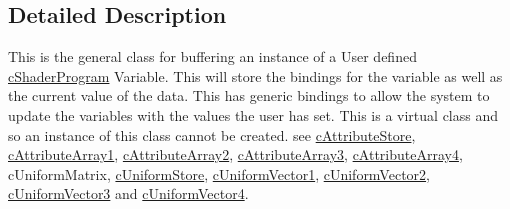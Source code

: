 \subsection{Detailed Description}
This is the general class for buffering an instance of a User defined \hyperlink{classc_shader_program}{cShaderProgram} Variable. This will store the bindings for the variable as well as the current value of the data. This has generic bindings to allow the system to update the variables with the values the user has set. This is a virtual class and so an instance of this class cannot be created. see \hyperlink{classc_attribute_store}{cAttributeStore}, \hyperlink{classc_attribute_array1}{cAttributeArray1}, \hyperlink{classc_attribute_array2}{cAttributeArray2}, \hyperlink{classc_attribute_array3}{cAttributeArray3}, \hyperlink{classc_attribute_array4}{cAttributeArray4}, cUniformMatrix, \hyperlink{classc_uniform_store}{cUniformStore}, \hyperlink{classc_uniform_vector1}{cUniformVector1}, \hyperlink{classc_uniform_vector2}{cUniformVector2}, \hyperlink{classc_uniform_vector3}{cUniformVector3} and \hyperlink{classc_uniform_vector4}{cUniformVector4}. 